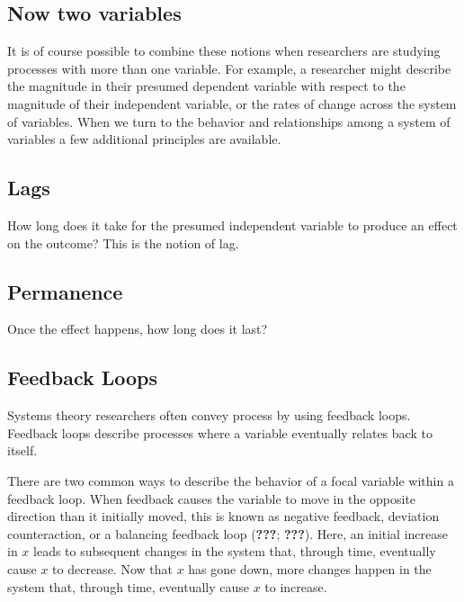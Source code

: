 \documentclass[english,,man]{apa6}
\theoremstyle{definition}
\theoremstyle{definition}
\theoremstyle{definition}
\theoremstyle{remark}
\begin{document}
\hypertarget{now-two-variables}{%
\subsection{Now two variables}\label{now-two-variables}}

It is of course possible to combine these notions when researchers are
studying processes with more than one variable. For example, a
researcher might describe the magnitude in their presumed dependent
variable with respect to the magnitude of their independent variable, or
the rates of change across the system of variables. When we turn to the
behavior and relationships among a system of variables a few additional
principles are available.

\hypertarget{lags}{%
\subsection{Lags}\label{lags}}

How long does it take for the presumed independent variable to produce
an effect on the outcome? This is the notion of lag.

\hypertarget{permanence}{%
\subsection{Permanence}\label{permanence}}

Once the effect happens, how long does it last?

\hypertarget{feedback-loops}{%
\subsection{Feedback Loops}\label{feedback-loops}}

Systems theory researchers often convey process by using feedback loops.
Feedback loops describe processes where a variable eventually relates
back to itself.

There are two common ways to describe the behavior of a focal variable
within a feedback loop. When feedback causes the variable to move in the
opposite direction than it initially moved, this is known as negative
feedback, deviation counteraction, or a balancing feedback loop
({\textbf{???}}; {\textbf{???}}). Here, an initial increase in \(x\)
leads to subsequent changes in the system that, through time, eventually
cause \(x\) to decrease. Now that \(x\) has gone down, more changes
happen in the system that, through time, eventually cause \(x\) to
increase.
\end{document}
